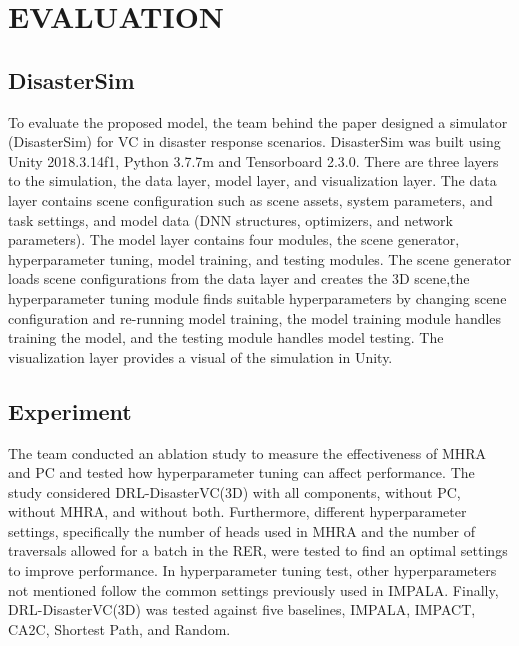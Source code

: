 \documentclass[sigconf, natbib=false]{acmart}
\begin{document}
   
   \section{EVALUATION}
   \subsection{DisasterSim}
   To evaluate the proposed model, the team behind the paper designed a simulator (DisasterSim) for VC in disaster response scenarios. DisasterSim was built using Unity 2018.3.14f1, Python 3.7.7m and Tensorboard 2.3.0. There are three layers to the simulation, the data layer, model layer, and visualization layer. The data layer contains scene configuration such as scene assets, system parameters, and task settings, and model data (DNN structures, optimizers, and network parameters). The model layer contains four modules, the scene generator, hyperparameter tuning, model training, and testing modules. The scene generator loads scene configurations from the data layer and creates the 3D scene,the hyperparameter tuning module finds suitable hyperparameters by changing scene configuration and re-running model training, the model training module handles training the model, and the testing module handles model testing. The visualization layer provides a visual of the simulation in Unity.
   
   \subsection{Experiment}
   The team conducted an ablation study to measure the effectiveness of MHRA and PC and tested how hyperparameter tuning can affect performance. The study considered DRL-DisasterVC(3D) with all components, without PC, without MHRA, and without both. Furthermore, different hyperparameter settings, specifically the number of heads used in MHRA and the number of traversals allowed for a batch in the RER, were tested to find an optimal settings to improve performance. In hyperparameter tuning test, other hyperparameters not mentioned follow the common settings previously used in IMPALA. Finally, DRL-DisasterVC(3D) was tested against five baselines, IMPALA, IMPACT, CA2C, Shortest Path, and Random.
   
\end{document}
